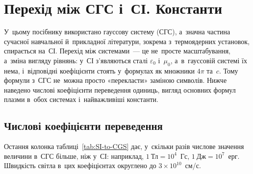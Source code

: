 

\section{Перехід між СГС і~СІ. Константи}\label{sec:SGStoSI}\hypertarget{app-sgs-si}{}

У~цьому посібнику використано гауссову систему (СГС), а~значна частина сучасної навчальної й~прикладної
літератури, зокрема з~термоядерних установок, спирається на~СІ. Перехід між системами~--- це не~просте
масштабування, а~зміна вигляду рівнянь: у~СІ з'являються сталі $\varepsilon_0$ і~$\mu_0$, а~в~гауссовій системі
їх нема, і~відповідні коефіцієнти стоять у~формулах як множники $4\pi$ та~$c$. Тому формули з~СГС не~можна
просто «перекласти» заміною символів. Нижче наведено числові коефіцієнти переведення одиниць, вигляд основних
формул плазми в~обох системах і~найважливіші константи.

\subsection*{Числові коефіцієнти переведення}

Остання колонка таблиці~\ref{tab:SI-to-CGS} дає, у~скільки разів числове значення величини в~СГС більше,
ніж у~СІ: наприклад, $1~\text{Тл}=10^{4}$~Гс, $1~\text{Дж}=10^{7}$~ерг. Швидкість світла в~цих коефіцієнтах
округлено до $3\times10^{10}$~см/с.

